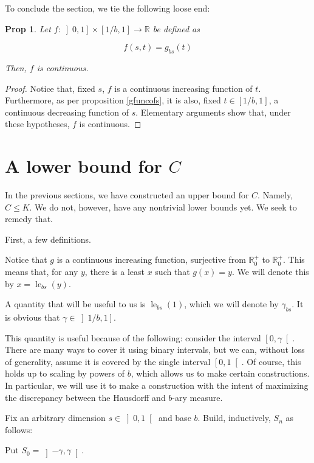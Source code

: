 \documentclass[11pt]{amsart}
\newcommand{\R}{\mathbb{R}}
\newtheorem{prop}{Prop}
\DeclareMathOperator{\len}{le}
\begin{document}
To conclude the section, we tie the following loose end:

\begin{prop}
Let $f : \left]0, 1\right] \times \left[1/b, 1\right] \to \R$ be defined as

\[f(s, t) = g_{bs}(t)\]

Then, $f$ is continuous.
\end{prop}

\begin{proof}
Notice that, fixed $s$, $f$ is a continuous increasing function of $t$. Furthermore, as per proposition \ref{gfuncofs}, it is also, fixed $t \in \left[1/b, 1 \right]$, a continuous decreasing function of $s$. Elementary arguments show that, under these hypotheses, $f$ is continuous. %
\end{proof}

\section{A lower bound for $C$}

In the previous sections, we have constructed an upper bound for $C$. Namely, $C \leq K$. We do not, however, have any nontrivial lower bounds yet. We seek to remedy that.

First, a few definitions.

Notice that $g$ is a continuous increasing function, surjective from $\R^+_0$ to $\R^+_0$. This means that, for any $y$, there is a least $x$ such that $g(x) = y$. We will denote this by $x = \len_{bs}(y)$.

A quantity that will be useful to us is $\len_{bs}(1)$, which we will denote by $\gamma_{bs}$. It is obvious that $\gamma \in \left] 1/b, 1 \right]$.

This quantity is useful because of the following: consider the interval $\left[0, \gamma \right[$. There are many ways to cover it using binary intervals, but we can, without loss of generality, assume it is covered by the single interval $\left[0, 1 \right[$. Of course, this holds up to scaling by powers of $b$, which allows us to make certain constructions. In particular, we will use it to make a construction with the intent of maximizing the discrepancy between the Hausdorff and $b$-ary measure.

Fix an arbitrary dimension $s \in \left]0, 1 \right[$ and base $b$. Build, inductively, $S_n$ as follows:

Put $S_0 = \left]-\gamma, \gamma\right[$.
\end{document}
